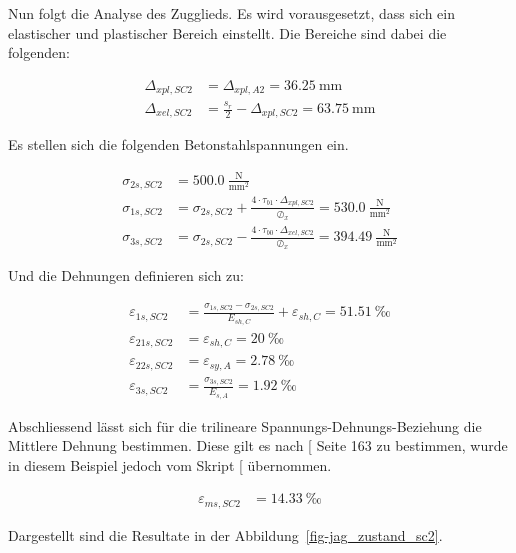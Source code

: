\documentclass[
  11pt,
  letterpaper,
]{scrreprt}
\begin{document}
Nun folgt die Analyse des Zugglieds. Es wird vorausgesetzt, dass sich
ein elastischer und plastischer Bereich einstellt. Die Bereiche sind
dabei die folgenden:

\[
\begin{aligned}
\Delta_{x pl , SC2}& = \Delta_{x pl , A2} = 36.25 \ \mathrm{mm} \\ 
\Delta_{x el , SC2}& = \frac{s_{r}}{2} - \Delta_{x pl , SC2} = 63.75 \ \mathrm{mm} \end{aligned}
\]

Es stellen sich die folgenden Betonstahlspannungen ein.

\[
\begin{aligned}
\sigma_{2 s , SC2}& = 500.0 \ \frac{\mathrm{N}}{\mathrm{mm}^{2}} \\ 
\sigma_{1 s , SC2}& = \sigma_{2 s , SC2} + \frac{4 \cdot \tau_{b1} \cdot \Delta_{x pl , SC2}}{\oslash_{x}} = 530.0 \ \frac{\mathrm{N}}{\mathrm{mm}^{2}} \\ 
\sigma_{3 s , SC2}& = \sigma_{2 s , SC2} - \frac{4 \cdot \tau_{b0} \cdot \Delta_{x el , SC2}}{\oslash_{x}} = 394.49 \ \frac{\mathrm{N}}{\mathrm{mm}^{2}} \end{aligned}
\]

Und die Dehnungen definieren sich zu:

\[
\begin{aligned}
\varepsilon_{1 s , SC2}& = \frac{\sigma_{1 s , SC2} - \sigma_{2 s , SC2}}{E_{sh , C}} + \varepsilon_{sh , C} = 51.51 \ \mathrm{‰} \\ 
\varepsilon_{21 s , SC2}& = \varepsilon_{sh , C} = 20 \ \mathrm{‰} \\ 
\varepsilon_{22 s , SC2}& = \varepsilon_{sy , A} = 2.78 \ \mathrm{‰} \\ 
\varepsilon_{3 s , SC2}& = \frac{\sigma_{3 s , SC2}}{E_{s , A}} = 1.92 \ \mathrm{‰} \end{aligned}
\]

Abschliessend lässt sich für die trilineare Spannungs-Dehnungs-Beziehung
die Mittlere Dehnung bestimmen. Diese gilt es nach
{[}\citeproc{ref-alvarez_einfluss_1998}{10}{]} Seite 163 zu bestimmen,
wurde in diesem Beispiel jedoch vom Skript
{[}\citeproc{ref-jager_stahlbeton_2009}{3}{]} übernommen.

\[
\begin{aligned}
\varepsilon_{m s , SC2}& = 14.33 \ \mathrm{‰} \end{aligned}
\]

Dargestellt sind die Resultate in der
Abbildung~\ref{fig-jag_zustand_sc2}.
\end{document}

